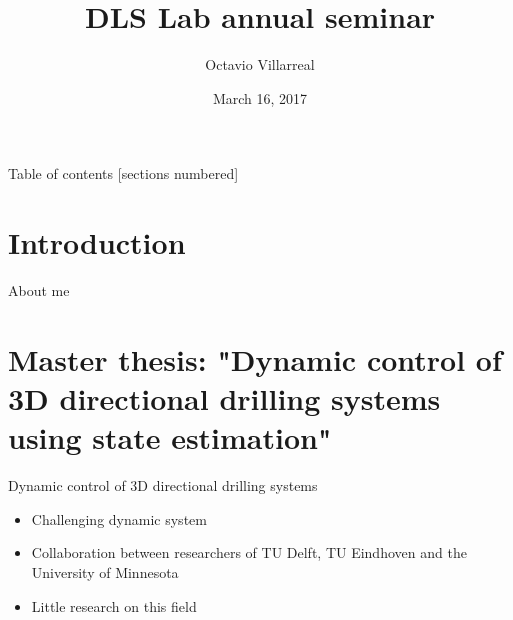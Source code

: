 \documentclass[10pt]{beamer}
\title{DLS Lab annual seminar}
\subtitle{}
\date{March 16, 2017}
\author{Octavio Villarreal}
\institute{Istituto Italiano di Tecnologia}
\begin{document}
\maketitle

\begin{frame}{Table of contents}
  [sections numbered]
  \tableofcontents[hideallsubsections]
\end{frame}

\section{Introduction}
\begin{frame}{About me}

\end{frame}
\section{Master thesis: "Dynamic control of 3D directional drilling systems using state estimation"}

\begin{frame}{Dynamic control of 3D directional drilling systems}
	\begin{itemize}\setlength\itemsep{2.5em}
		\item Challenging dynamic system
		\item Collaboration between researchers of TU Delft, TU Eindhoven and the University of Minnesota
		\item Little research on this field
	\end{itemize}
\end{frame}
\end{document}
